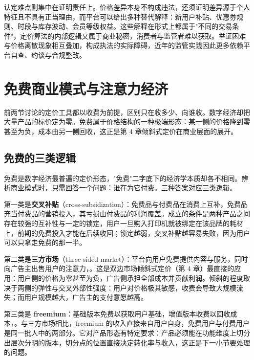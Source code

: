 认定难点则集中在证明责任上。价格差异本身不构成违法，还须证明差异源于个人特征且不具有正当理由，而平台可以给出多种替代解释：新用户补贴、优惠券规则、时段与库存波动、会员等级权益。这些解释在形式上都属于"不同的交易条件"，定价算法的内部逻辑又属于商业秘密，消费者与监管者难以获取。举证困难与价格离散现象相互叠加，构成执法的实际障碍，近年的监管实践因此更多依赖平台自查、约谈与合规整改。

\section{免费商业模式与注意力经济}

前两节讨论的定价工具都以收费为前提，区别只在收多少、向谁收。数字经济却把大量产品的标价定为零。免费属于价格结构的一种极端形态：某一侧的价格降到零甚至为负，成本由另一侧回收，这正是第 4 章倾斜式定价在商业层面的展开。

\subsection{免费的三类逻辑}

免费是数字经济最普遍的定价形态，"免费"二字底下的经济学本质却各不相同。辨析商业模式时，只需回答一个问题：谁在为它付费。三种答案对应三类逻辑。

第一类是\textbf{交叉补贴}（cross-subsidization）：免费品与付费品在消费上互补，免费品充当付费品的营销投入，其亏损由付费品的利润覆盖。成立的条件是两种产品之间存在较强的互补性与一定的锁定，用户一旦购入打印机就被绑定在该品牌的耗材上，前期的免费投入才能在后续收回；锁定越弱，交叉补贴越容易失败，因为用户可以只拿走免费的那一半。

第二类是\textbf{三方市场}（three-sided market）：平台向用户免费提供内容与服务，同时向广告主出售用户的注意力，。这是双边市场倾斜式定价（第 4 章）最直接的应用：用户侧的价格为零甚至为负，广告侧承担全部成本并贡献利润。倾斜的程度取决于两侧的弹性与交叉外部性强度：用户对价格极其敏感，收费会导致大规模流失；而用户规模越大，广告主的支付意愿越高。

第三类是 \textbf{freemium}：基础版本免费以获取用户基础，增值版本收费以回收成本，。与三方市场相比，freemium 的收入直接来自用户自身，免费用户与付费用户是同一批人中的两部分。它对产品形态有特定要求：产品必须能在功能维度上切分出层次分明的版本，切分点的位置直接决定转化率与收入，这正是下一小节要处理的问题。

